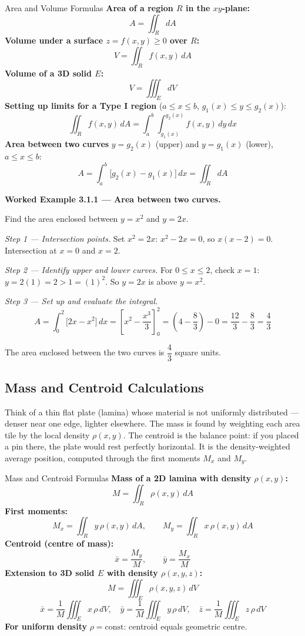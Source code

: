 \documentclass[12pt,a4paper]{article}
\begin{document}
\begin{infobox}{Area and Volume Formulas}
\textbf{Area of a region \(R\) in the \(xy\)-plane:}
\[
A = \iint_R dA
\]
\textbf{Volume under a surface \(z = f(x,y) \geq 0\) over \(R\):}
\[
V = \iint_R f(x,y)\,dA
\]
\textbf{Volume of a 3D solid \(E\):}
\[
V = \iiint_E dV
\]
\textbf{Setting up limits for a Type I region} (\(a \leq x \leq b\), \(g_1(x) \leq y \leq g_2(x)\)):
\[
\iint_R f(x,y)\,dA = \int_a^b \int_{g_1(x)}^{g_2(x)} f(x,y)\,dy\,dx
\]
\textbf{Area between two curves} \(y = g_2(x)\) (upper) and \(y = g_1(x)\) (lower), \(a \leq x \leq b\):
\[
A = \int_a^b \bigl[g_2(x) - g_1(x)\bigr]\,dx = \iint_R dA
\]
\end{infobox}

\textbf{Worked Example 3.1.1 --- Area between two curves.}

Find the area enclosed between \(y = x^2\) and \(y = 2x\).

\textit{Step 1 --- Intersection points.}
Set \(x^2 = 2x\): \(x^2 - 2x = 0\), so \(x(x-2) = 0\). Intersection at \(x = 0\) and \(x = 2\).

\textit{Step 2 --- Identify upper and lower curves.}
For \(0 \leq x \leq 2\), check \(x = 1\): \(y = 2(1) = 2 > 1 = (1)^2\). So \(y = 2x\) is above \(y = x^2\).

\textit{Step 3 --- Set up and evaluate the integral.}
\[
A = \int_0^2 \bigl[2x - x^2\bigr]\,dx
= \left[x^2 - \frac{x^3}{3}\right]_0^2
= \left(4 - \frac{8}{3}\right) - 0
= \frac{12}{3} - \frac{8}{3}
= \frac{4}{3}
\]

The area enclosed between the two curves is \(\dfrac{4}{3}\) square units.

\subsection{Mass and Centroid Calculations}

Think of a thin flat plate (lamina) whose material is not uniformly distributed --- denser near one edge, lighter elsewhere. The mass is found by weighting each area tile by the local density \(\rho(x,y)\). The centroid is the balance point: if you placed a pin there, the plate would rest perfectly horizontal. It is the density-weighted average position, computed through the first moments \(M_x\) and \(M_y\).

\begin{infobox}{Mass and Centroid Formulas}
\textbf{Mass of a 2D lamina with density \(\rho(x,y)\):}
\[
M = \iint_R \rho(x,y)\,dA
\]
\textbf{First moments:}
\[
M_x = \iint_R y\,\rho(x,y)\,dA, \qquad M_y = \iint_R x\,\rho(x,y)\,dA
\]
\textbf{Centroid (centre of mass):}
\[
\bar{x} = \frac{M_y}{M}, \qquad \bar{y} = \frac{M_x}{M}
\]
\textbf{Extension to 3D solid \(E\) with density \(\rho(x,y,z)\):}
\[
M = \iiint_E \rho(x,y,z)\,dV
\]
\[
\bar{x} = \frac{1}{M}\iiint_E x\,\rho\,dV, \quad
\bar{y} = \frac{1}{M}\iiint_E y\,\rho\,dV, \quad
\bar{z} = \frac{1}{M}\iiint_E z\,\rho\,dV
\]
\textbf{For uniform density} \(\rho = \text{const}\): centroid equals geometric centre.
\end{infobox}
\end{document}
